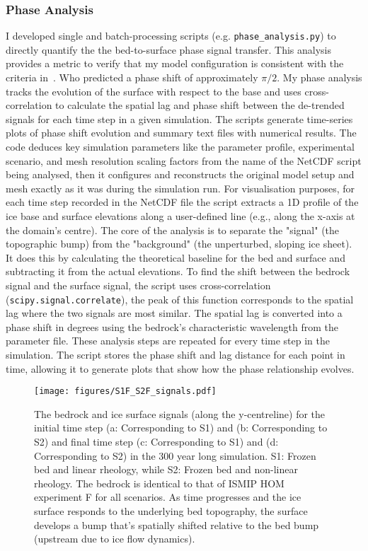\subsubsection{Phase Analysis}
I developed single and batch-processing scripts (e.g. \texttt{phase\_analysis.py}) to directly quantify the the bed-to-surface phase signal transfer. This analysis provides a metric to verify that my model configuration is consistent with the criteria in~\cite{Budd_1970}. Who predicted a phase shift of approximately $\pi / 2$. 
My phase analysis tracks the evolution of the surface with respect to the base and uses cross-correlation to calculate the spatial lag and phase shift between the de-trended signals for each time step in a given simulation.
The scripts generate time-series plots of phase shift evolution and summary text files with numerical results. The code deduces key simulation parameters like the parameter profile, experimental scenario, and mesh resolution scaling factors from the name of the NetCDF script being analysed, then it configures and reconstructs the original model setup and mesh exactly as it was during the simulation run. For visualisation purposes, for each time step recorded in the NetCDF file the script extracts a 1D profile of the ice base and surface elevations along a user-defined line (e.g., along the x-axis at the domain's centre). The core of the analysis is to separate the "signal" (the topographic bump) from the "background" (the unperturbed, sloping ice sheet). It does this by calculating the theoretical baseline for the bed and surface and subtracting it from the actual elevations. To find the shift between the bedrock signal and the surface signal, the script uses cross-correlation (\texttt{scipy.signal.correlate}), the peak of this function corresponds to the spatial lag where the two signals are most similar.
The spatial lag is converted into a phase shift in degrees using the bedrock's characteristic wavelength from the parameter file. These analysis steps are repeated for every time step in the simulation. The script stores the phase shift and lag distance for each point in time, allowing it to generate plots that show how the phase relationship evolves.
\begin{figure}[H]
    \texttt{[image: figures/S1F\_S2F\_signals.pdf]}
    \caption{The bedrock and ice surface signals (along the y-centreline) for the initial time step (a: Corresponding to S1) and (b: Corresponding to S2) and final time step (c: Corresponding to S1) and (d: Corresponding to S2) in the 300 year long simulation. S1: Frozen bed and linear rheology, while S2: Frozen bed and non-linear rheology. The bedrock is identical to that of ISMIP HOM experiment F for all scenarios. As time progresses and the ice surface responds to the underlying bed topography, the surface develops a bump that's spatially shifted relative to the bed bump (upstream due to ice flow dynamics).}
    \label{fig:phase_analysis_Signals_S1S2}
\end{figure}
